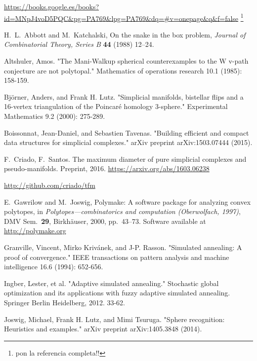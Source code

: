 \documentclass[12pt,a4paper]{article}
\newcommand{\copa}[1]{\footnote{\color{blue} #1}}
\theoremstyle{plain}
\theoremstyle{definition}
\begin{document}
\begin{thebibliography}{99}

  \url{https://books.google.es/books?id=MNpJ4voD5PQC&pg=PA769&lpg=PA769&dq=#v=onepage&q&f=false}
  \copa{pon la referencia completa!!}


H.~L.~Abbott and M.~Katchalski, On the snake in the box problem, \emph{Journal of Combinatorial Theory, Series B} {\bf 44} (1988) 12--24.

  Altshuler, Amos. "The Mani-Walkup spherical counterexamples to the W v-path conjecture are not polytopal." Mathematics of operations research 10.1 (1985): 158-159.

  Björner, Anders, and Frank H. Lutz. "Simplicial manifolds, bistellar flips and a 16-vertex triangulation of the Poincaré homology 3-sphere." Experimental Mathematics 9.2 (2000): 275-289.

  Boissonnat, Jean-Daniel, and Sebastien Tavenas. "Building efficient and compact data structures for simplicial complexes." arXiv preprint arXiv:1503.07444 (2015).

  F.~Criado, F.~Santos.
  The maximum diameter of pure simplicial complexes and pseudo-manifolds.
  Preprint, 2016.
  \url{https://arxiv.org/abs/1603.06238}

  \url{http://github.com/criado/tfm}

E.~Gawrilow and M.~Joswig,
Polymake: A software package for analyzing convex polytopes,
in \emph{Polytopes---combinatorics and computation (Oberwolfach, 1997)},
DMV Sem.~\textbf{29}, Birkh\"auser, 2000, pp.~43--73.
Software available at \url{http://polymake.org}

  Granville, Vincent, Mirko Krivánek, and J-P. Rasson. "Simulated annealing: A proof of convergence." IEEE transactions on pattern analysis and machine intelligence 16.6 (1994): 652-656.

  Ingber, Lester, et al. "Adaptive simulated annealing." Stochastic global optimization and its applications with fuzzy adaptive simulated annealing. Springer Berlin Heidelberg, 2012. 33-62.

  Joswig, Michael, Frank H. Lutz, and Mimi Tsuruga. "Sphere recognition: Heuristics and examples." arXiv preprint arXiv:1405.3848 (2014).


\end{thebibliography}
\end{document}
